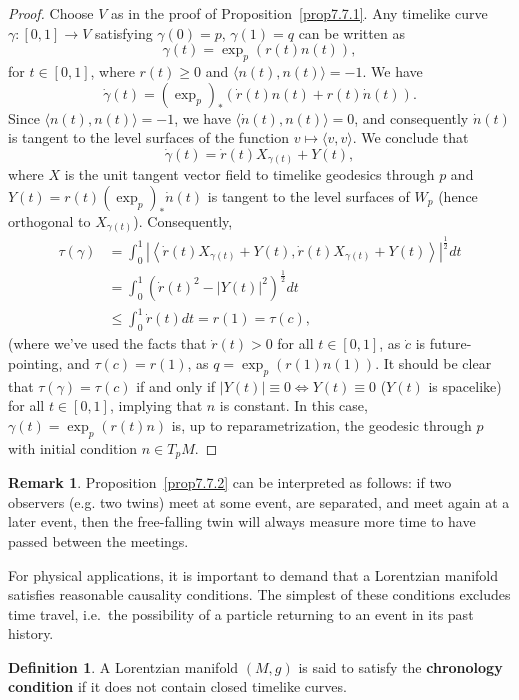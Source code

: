 \documentclass[10pt]{amsart}
\theoremstyle{definition}
\newtheorem{Def}[Thm]{Definition}
\newtheorem{Remark}[Thm]{Remark}
\theoremstyle{remark}
\begin{document}
\begin{proof}
Choose $V$ as in the proof of Proposition~\ref{prop7.7.1}. Any timelike curve $\gamma:[0,1] \to V$ satisfying $\gamma(0)=p$, $\gamma(1)=q$ can be written as
\[
\gamma(t)=\exp_p(r(t)n(t)),
\]
for $t \in [0,1]$, where $r(t) \geq 0$ and $\langle n(t), n(t) \rangle = -1$. We have
\[
\dot{\gamma}(t)=(\exp_p)_*\left(\dot{r}(t)n(t)+r(t)\dot{n}(t)\right).
\]
Since $\langle n(t), n(t) \rangle = -1$, we have $\langle \dot{n}(t), n(t) \rangle = 0$, and consequently $\dot{n}(t)$ is tangent to the level surfaces of the function $v \mapsto \langle v, v \rangle$. We conclude that
\[
\dot{\gamma}(t) = \dot{r}(t) X_{\gamma(t)} + Y(t),
\]
where $X$ is the unit tangent vector field to timelike geodesics through $p$ and $Y(t)=r(t)(\exp_p)_*\dot{n}(t)$ is tangent to the level surfaces of $W_p$ (hence orthogonal to $X_{\gamma(t)}$). Consequently,
\begin{align*}
\tau(\gamma) & = \int_0^1 \left|\left\langle \dot{r}(t) X_{\gamma(t)} + Y(t),\dot{r}(t) X_{\gamma(t)} + Y(t) \right\rangle\right|^\frac12 dt \\
& = \int_0^1 \left( \dot{r}(t)^2 - |Y(t)|^2 \right)^\frac12 dt \\
& \leq \int_0^1 \dot{r}(t) dt = r(1) = \tau(c),
\end{align*}
(where we've used the facts that $\dot{r}(t)> 0$ for all $t \in [0,1]$, as $\dot{c}$ is future-pointing, and $\tau(c)=r(1)$, as $q=\exp_p(r(1)n(1))$. It should be clear that $\tau(\gamma)=\tau(c)$ if and only if $|Y(t)|\equiv 0 \Leftrightarrow Y(t)\equiv 0$ ($Y(t)$ is spacelike) for all $t \in [0,1]$, implying that $n$ is constant. In this case, $\gamma(t)=\exp_p({r(t)n})$ is, up to reparametrization, the geodesic through $p$ with initial condition $n \in T_p M$.
\end{proof}

\begin{Remark}
Proposition~\ref{prop7.7.2} can be interpreted as follows: if two observers (e.g. two twins) meet at some event, are separated, and meet again at a later event, then the free-falling twin will always measure more time to have passed between the meetings.
\end{Remark}

For physical applications, it is important to demand that a Lorentzian manifold satisfies reasonable causality conditions. The simplest of these conditions excludes time travel, i.e.~the possibility of a particle returning to an event in its past history.

\begin{Def}
A Lorentzian manifold $(M,g)$ is said to satisfy the {\bf chronology condition} if it does not contain closed timelike curves.
\end{Def}
\end{document}
